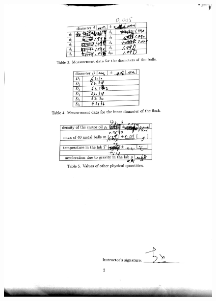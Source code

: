 \documentclass[a4paper]{report}
\begin{document}
	\begin{figure}[H]
		\centering
		\includegraphics[width=1\linewidth]{3.jpg}
	\end{figure}
\end{document}
